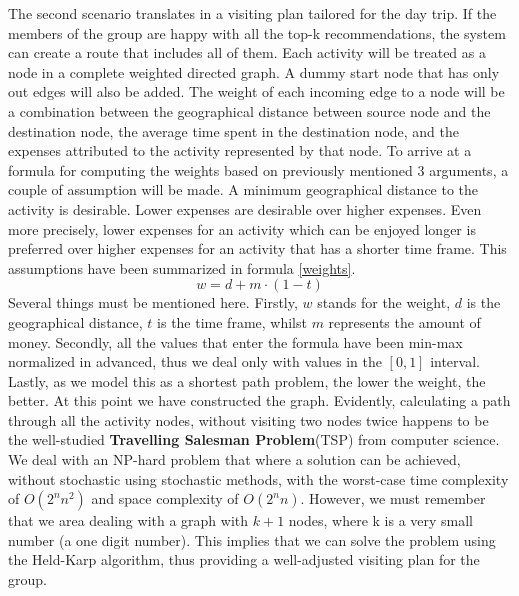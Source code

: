 \documentclass[11pt,a4paper,oneside]{article}
\begin{document}
The second scenario translates in a visiting plan tailored for the day trip. If the members of the group are happy with all the top-k recommendations, the system can create a route that includes all of them. Each activity will be treated as a node in a complete weighted directed graph. A dummy start node that has only out edges will also be added. The weight of each incoming edge to a node will be a combination between the geographical distance between source node and the destination node, the average time spent in the destination node, and the expenses attributed to the activity represented by that node. To arrive at a formula for computing the weights based on previously mentioned 3 arguments, a couple of assumption will be made. A minimum geographical distance to the activity is desirable. Lower expenses are desirable over higher expenses. Even more precisely, lower expenses for an activity which can be enjoyed longer is preferred over higher expenses for an activity that has a shorter time frame. This assumptions have been summarized in formula \ref{weights}.
\begin{equation}
    \label{weights}
    w = d + m \cdot (1 - t)
\end{equation}
Several things must be mentioned here. Firstly, $w$ stands for the weight, $d$ is the geographical distance, $t$ is the time frame, whilst $m$ represents the amount of money. Secondly, all the values that enter the formula have been min-max normalized in advanced, thus we deal only with values in the $[0, 1]$ interval. Lastly, as we model this as a shortest path problem, the lower the weight, the better. At this point we have constructed the graph. Evidently, calculating a path through all the activity nodes, without visiting two nodes twice happens to be the well-studied \textbf{Travelling Salesman Problem}(TSP) from computer science. We deal with an NP-hard problem that where a solution can be achieved, without stochastic using stochastic methods, with the worst-case time complexity of $O(2^nn^2)$ and space complexity of $O(2^nn)$. However, we must remember that we area dealing with a graph with $k+1$ nodes, where k is a very small number (a one digit number). This implies that we can solve the problem using the Held-Karp algorithm, thus providing a well-adjusted visiting plan for the group.
\end{document}
